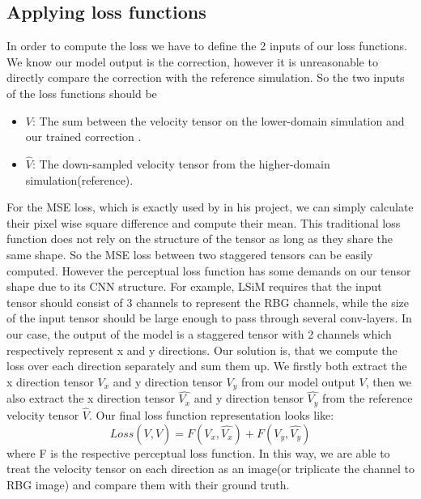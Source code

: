\documentclass[a4paper,12pt,twoside]{report}
\begin{document}
\subsection{Applying loss functions}
In order to compute the loss we have to define the 2 inputs of our loss functions. We know our model output is the correction, however it is unreasonable to directly compare the correction with the reference simulation. So the two inputs of the loss functions should be 
\begin{itemize}
\item $V$: The sum between the velocity tensor on the lower-domain simulation and our trained correction .

\item $\hat{V}$: The down-sampled velocity tensor from the higher-domain simulation(reference).
\end{itemize}


For the MSE loss, which is exactly used by \citeauthor{um2020sol} in his project, we can simply calculate their pixel wise square difference and compute their mean. This traditional loss function does not rely on the structure of the tensor as long as they share the same shape. So the MSE loss between two staggered tensors can be easily computed. However the perceptual loss function has some demands on our tensor shape due to its CNN structure. For example, LSiM requires that the input tensor should consist of 3 channels to represent the RBG channels, while the size of the input tensor should be large enough to pass through several conv-layers. In our case, the output of the model is a staggered tensor with 2 channels which respectively represent x and y directions. Our solution is, that we compute the loss over each direction separately and sum them up. We firstly both extract the x direction tensor $V_x$ and y direction tensor $V_y$ from our model output $V$, then we also extract the x direction tensor $\hat{V_x}$ and y direction tensor $\hat{V_y}$ from the reference velocity tensor $\hat{V}$. Our final loss function representation looks like:
\begin{equation}
 Loss(V, \hat{V}) = F(V_x, \hat{V_x}) + F(V_y, \hat{V_y})
\end{equation}
where F is the respective perceptual loss function. In this way, we are able to treat the velocity tensor on each direction as an image(or triplicate the channel to RBG image) and compare them with their ground truth.  
\end{document}
